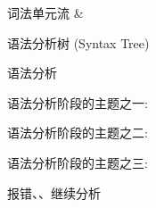 
\begin{frame}{}
  \begin{center}
     词法单元流 \& 

    \vspace{0.50cm}

    \vspace{0.30cm}
     语法分析树 (Syntax Tree)
  \end{center}
\end{frame}

\begin{frame}{}
  \begin{center}
    语法分析

  \end{center}
\end{frame}

\begin{frame}{}
  \begin{center}
    语法分析阶段的主题之一: 

  \end{center}
\end{frame}

\begin{frame}{}
  \begin{center}
    语法分析阶段的主题之二: 

  \end{center}
\end{frame}

\begin{frame}{}
  \begin{center}
    语法分析阶段的主题之三: 

    
    报错、、继续分析
  \end{center}
\end{frame}
